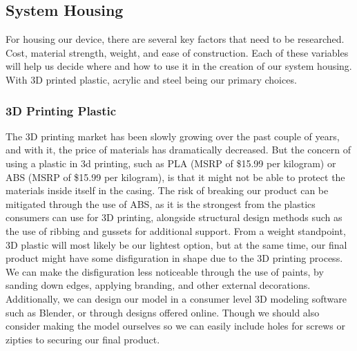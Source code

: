 \documentclass[onecolumn, draftclsnofoot,10pt, compsoc]{IEEEtran}
\begin{document}
    \subsection{System Housing}
    For housing our device, there are several key factors that need to be researched. Cost, material strength, weight, and ease of construction. Each of these variables will help us decide where and how to use it in the creation of our system housing. With 3D printed plastic, acrylic and steel being our primary choices.
    
        \subsubsection{3D Printing Plastic}
        The 3D printing market has been slowly growing over the past couple of years, and with it, the price of materials has dramatically decreased. But the concern of using a plastic in 3d printing, such as PLA (MSRP of \$15.99 per kilogram)\cite{e1} or ABS (MSRP of \$15.99 per kilogram)\cite{e1}, is that it might not be able to protect the materials inside itself in the casing. The risk of breaking our product can be mitigated through the use of ABS, as it is the strongest from the plastics consumers can use for 3D printing\cite{e1}, alongside structural design methods such as the use of ribbing and gussets for additional support\cite{e2}. From a weight standpoint, 3D plastic will most likely be our lightest option, but at the same time, our final product might have some disfiguration in shape due to the 3D printing process. We can make the disfiguration less noticeable through the use of paints, by sanding down edges, applying branding, and other external decorations. Additionally, we can design our model in a consumer level 3D modeling software such as Blender, or through designs offered online. Though we should also consider making the model ourselves so we can easily include holes for screws or zipties to securing our final product.
        
\end{document}
